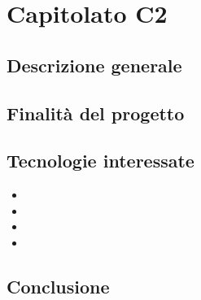 \chapter{Capitolato C2}
\section{Descrizione generale}

\section{Finalit\`a del progetto}

\section{Tecnologie interessate}
\begin{itemize}
	\item 
	\item 
	\item 
	\item 
\end{itemize}
\section{Conclusione}
